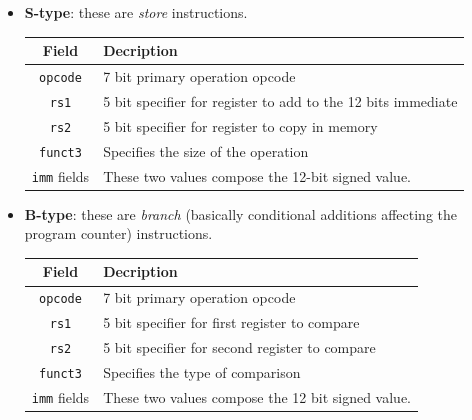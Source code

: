 \documentclass[a4paper,11pt]{article}
\begin{document}
\begin{itemize}
	\item \textbf{S-type}: these are \textit{store} instructions.
	      \begin{table}[H]
		      \center
		      \begin{tabular} { c | p{12cm} }
			      \bfseries Field     & \bfseries Decription                                         \\
			      \hline
			      \texttt{opcode}     & 7 bit primary operation opcode                               \\
			      \texttt{rs1}        & 5 bit specifier for register to add to the 12 bits immediate \\
			      \texttt{rs2}        & 5 bit specifier for register to copy in memory               \\
			      \texttt{funct3}     & Specifies the size of the operation                          \\
			      \texttt{imm} fields & These two values compose the 12-bit signed value.            \\
		      \end{tabular}
	      \end{table}

	\item \textbf{B-type}: these are \textit{branch} (basically conditional additions affecting the program counter) instructions.
	      \begin{table}[H]
		      \center
		      \begin{tabular} { c | p{12cm} }
			      \bfseries Field     & \bfseries Decription                              \\
			      \hline
			      \texttt{opcode}     & 7 bit primary operation opcode                    \\
			      \texttt{rs1}        & 5 bit specifier for first register to compare     \\
			      \texttt{rs2}        & 5 bit specifier for second register to compare    \\
			      \texttt{funct3}     & Specifies the type of comparison                  \\
			      \texttt{imm} fields & These two values compose the 12 bit signed value. \\
		      \end{tabular}
	      \end{table}


\end{itemize}
\end{document}
